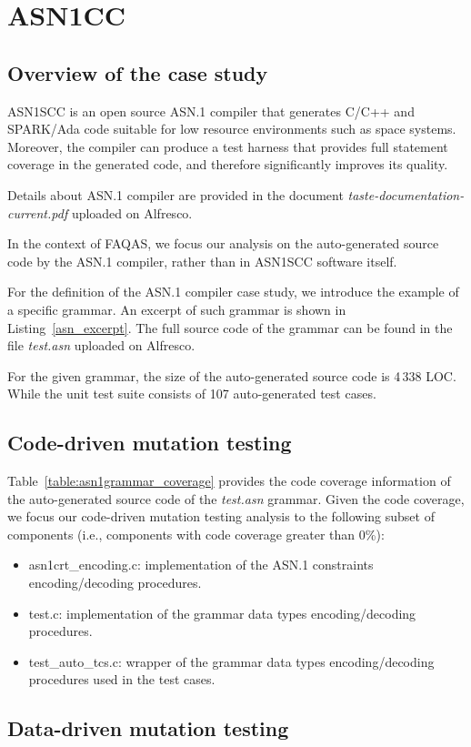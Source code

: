 
\section{ASN1CC}
\label{sec:caseStudies:GSL:ASN1}

\subsection{Overview of the case study}

ASN1SCC is an open source ASN.1 compiler that generates C/C++ and SPARK/Ada code suitable for low resource environments such as space systems. Moreover, the compiler can produce a test harness that provides full statement coverage in the generated code, and therefore significantly improves its quality.

Details about ASN.1 compiler are provided in the document \emph{taste-documentation-current.pdf} uploaded on Alfresco.

In the context of FAQAS, we focus our analysis on the auto-generated source code by the ASN.1 compiler, rather than in ASN1SCC software itself.

For the definition of the ASN.1 compiler case study, we introduce the example of a specific grammar. An excerpt of such grammar is shown in Listing~\ref{asn_excerpt}. The full source code of the grammar can be found in the file \emph{test.asn} uploaded on Alfresco.

For the given grammar, the size of the auto-generated source code is 4\,338 LOC. While the unit test suite consists of 107 auto-generated test cases.



\subsection{Code-driven mutation testing}



Table~\ref{table:asn1grammar_coverage} provides the code coverage information of the auto-generated source code of the \emph{test.asn} grammar. Given the code coverage, we focus our code-driven mutation testing analysis to the following subset of components (i.e., components with code coverage greater than 0\%):

\begin{itemize}
	\item asn1crt\_encoding.c: implementation of the ASN.1 constraints encoding/decoding procedures.
	\item test.c: implementation of the grammar data types encoding/decoding procedures.
	\item test\_auto\_tcs.c: wrapper of the grammar data types encoding/decoding procedures used in the test cases.
\end{itemize}


\subsection{Data-driven mutation testing}









